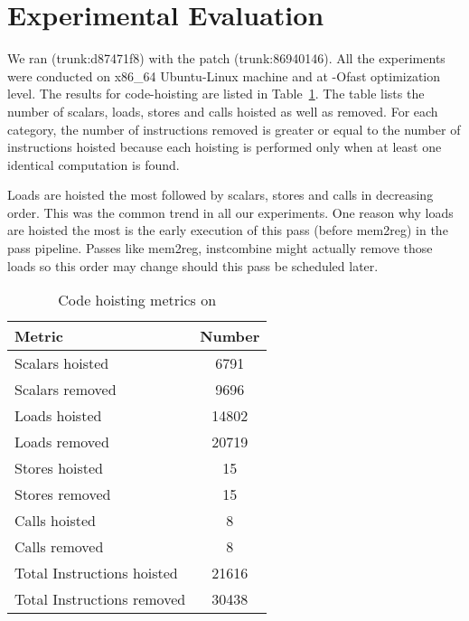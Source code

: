 \documentclass{sig-alternate}
\begin{document}
\section{Experimental Evaluation}
\label{sec:experimental-results}
We ran \LLVMTestSuite{} (trunk:d87471f8) with the patch (trunk:86940146). All
the experiments were conducted on x86\_64 Ubuntu-Linux machine and at -Ofast
optimization level.  The results for code-hoisting are listed in
Table~\ref{tab:hoist-results}. The table lists the number of scalars, loads,
stores and calls hoisted as well as removed. For each category, the number of
instructions removed is greater or equal to the number of instructions hoisted
because each hoisting is performed only when at least one identical computation
is found.

Loads are hoisted the most followed by scalars, stores and calls in decreasing
order.  This was the common trend in all our experiments. One reason why loads
are hoisted the most is the early execution of this pass (before mem2reg) in the
\LLVM{} pass pipeline. Passes like mem2reg, instcombine might actually remove
those loads so this order may change should this pass be scheduled later.

\begin{table}[h!]
  \begin{center}
    \begin{tabular}{|l|c|}
      \hline
      Metric               & Number\\\hline
      Scalars hoisted      & 6791  \\\hline
      Scalars removed      & 9696  \\\hline
      Loads hoisted        & 14802 \\\hline
      Loads removed        & 20719 \\\hline
      Stores hoisted       & 15    \\\hline
      Stores removed       & 15    \\\hline
      Calls hoisted        & 8     \\\hline
      Calls removed        & 8     \\\hline
      Total Instructions hoisted & 21616 \\\hline
      Total Instructions removed & 30438 \\\hline
\end{tabular}
  \end{center}
  \caption{Code hoisting metrics on \LLVMTestSuite{}}
  \label{tab:hoist-results}
\end{table}
\end{document}
